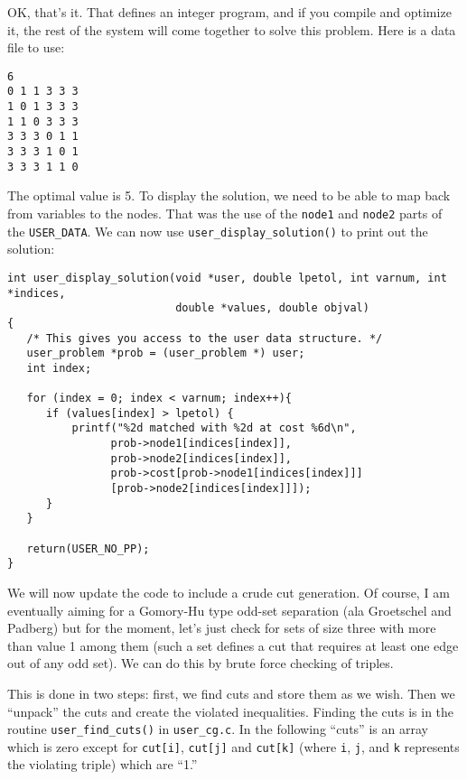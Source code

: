 \documentclass[11pt]{article}
\begin{document}
OK, that's it. That defines an integer program, and if you compile and
optimize it, the rest of the system will come together to solve this problem.
Here is a data file to use:
\begin{verbatim}
6
0 1 1 3 3 3
1 0 1 3 3 3
1 1 0 3 3 3
3 3 3 0 1 1
3 3 3 1 0 1
3 3 3 1 1 0
\end{verbatim}

The optimal value is 5. To display the solution, we need to be able to map
back from variables to the nodes. That was the use of the \texttt{node1} and
\texttt{node2} parts of the \texttt{USER\_DATA}. We can now use
\texttt{user\_display\_solution()} to print out the solution:

\begin{verbatim}
int user_display_solution(void *user, double lpetol, int varnum, int *indices,
                          double *values, double objval)
{
   /* This gives you access to the user data structure. */
   user_problem *prob = (user_problem *) user;
   int index;
 
   for (index = 0; index < varnum; index++){
      if (values[index] > lpetol) {
          printf("%2d matched with %2d at cost %6d\n",
                prob->node1[indices[index]],
                prob->node2[indices[index]],
                prob->cost[prob->node1[indices[index]]]
                [prob->node2[indices[index]]]);
      }	   
   }
   
   return(USER_NO_PP);
}
\end{verbatim}

We will now update the code to include a crude cut generation. Of course, I am
eventually aiming for a Gomory-Hu type odd-set separation (ala Groetschel and
Padberg) but for the moment, let's just check for sets of size three with more
than value 1 among them (such a set defines a cut that requires at least one
edge out of any odd set). We can do this by brute force checking of triples.

This is done in two steps: first, we find cuts and store them as we wish. Then
we ``unpack'' the cuts and create the violated inequalities. Finding the cuts
is in the routine \texttt{user\_find\_cuts()} in \texttt{user\_cg.c}. In the
following ``cuts'' is an array which is zero except for \texttt{cut[i]},
\texttt{cut[j]} and \texttt{cut[k]} (where \texttt{i}, \texttt{j}, and
\texttt{k} represents the violating triple) which are ``1.''
\end{document}
